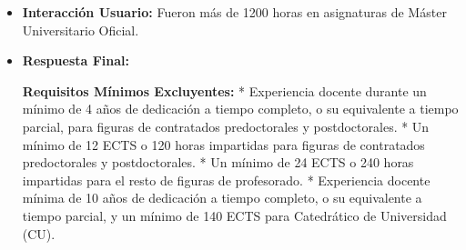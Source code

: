 \documentclass{article}
\begin{document}
\begin{itemize}
\begin{itemize}
                        \textbf{Puntuación:}
                        La puntuación se calculará en función de los criterios de evaluación, con un máximo de 100 puntos. El baremo se divide en varios apartados, incluyendo:

                        * Experiencia Docente (25-45 puntos)
                        + Dedicación Docente (25-35 puntos)
                        + Pluralidad, Interdisciplinariedad y Complejidad Docente (0-6 puntos)
                        + Recursos Educativos (0-5 puntos)
                        + Actividades de Formación a lo Largo de la Vida (0-5 puntos)
                        * Calidad de la Actividad Docente e Innovación (5-40 puntos)
                        + Calidad de la Actividad Docente (5-15 puntos)
                        + Proyectos de Innovación Docente (0-20 puntos)
                        + Formación para la Mejora Docente Recibida (0-5 puntos)
                        + Formación para la Mejora Docente Impartida (0-5 puntos)
                        * Tutorización Docente (0-15 puntos)
                        + Tutorización Reglada (0-15 puntos)
                        + Otros Tipos de Tutorización (0-15 puntos)
                        * Otros Méritos (0-10 puntos)

                        \textbf{Cálculo de Puntos:}
                        El cálculo de puntos se realizará en función de la experiencia docente y la dedicación a tiempo completo o parcial. Por ejemplo, si se ha impartido docencia durante 4 años a tiempo completo, se considerará un total de 24 ECTS o 240 horas impartidas, lo que supondría un máximo de 35 puntos en el apartado de Dedicación Docente.
                  \item \textbf{Interacción Usuario:} Fueron más de 1200 horas en asignaturas de Máster Universitario Oficial.
                  \item \textbf{Respuesta Final:}

                        \textbf{Requisitos Mínimos Excluyentes:}
                        * Experiencia docente durante un mínimo de 4 años de dedicación a tiempo completo, o su equivalente a tiempo parcial, para figuras de contratados predoctorales y postdoctorales.
                        * Un mínimo de 12 ECTS o 120 horas impartidas para figuras de contratados predoctorales y postdoctorales.
                        * Un mínimo de 24 ECTS o 240 horas impartidas para el resto de figuras de profesorado.
                        * Experiencia docente mínima de 10 años de dedicación a tiempo completo, o su equivalente a tiempo parcial, y un mínimo de 140 ECTS para Catedrático de Universidad (CU).


\end{itemize}
\end{itemize}
\end{document}
